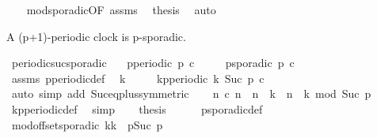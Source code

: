 \begin{isabellebody}
\ \ \isamarkupfalse%
\ mod{\isacharunderscore}sporadic{\isacharbrackleft}OF\ assms{\isacharparenleft}{}{\isacharparenright}{\isacharbrackright}\ \isamarkupfalse%
\ {\isacharquery}thesis\ \isamarkupfalse%
\ auto\isanewline
{}\isamarkupfalse%
%
\endisatagproof
{\isafoldproof}%
%
\isadelimproof
%
\endisadelimproof
%
\begin{isamarkuptext}%
A (p+1)-periodic clock is p-sporadic.%
\end{isamarkuptext}\isamarkuptrue%
\isamarkupfalse%
\ periodic{\isacharunderscore}suc{\isacharunderscore}sporadic{\isacharcolon}\isanewline
\ \ \ {\isacartoucheopen}p{\isacharunderscore}periodic\ {\isacharparenleft}p{\isacharplus}{}{\isacharparenright}\ c{\isacartoucheclose}\isanewline
\ \ \ \ \ {\isacartoucheopen}p{\isacharunderscore}sporadic\ p\ c{\isacartoucheclose}\isanewline
%
\isadelimproof
%
\endisadelimproof
%
\isatagproof
{}\isamarkupfalse%
\ {\isacharminus}\isanewline
\ \ \isamarkupfalse%
\ assms\ p{\isacharunderscore}periodic{\isacharunderscore}def\ \isamarkupfalse%
\ k\isanewline
\ \ \ \ \ {\isacartoucheopen}kp{\isacharunderscore}periodic\ k\ {\isacharparenleft}Suc\ p{\isacharparenright}\ c{\isacartoucheclose}\ \isamarkupfalse%
\ {\isacharparenleft}auto\ simp\ add{\isacharcolon}\ Suc{\isacharunderscore}eq{\isacharunderscore}plus{}{\isacharbrackleft}symmetric{\isacharbrackright}{\isacharparenright}\isanewline
\ \ \isamarkupfalse%
\ {\isacartoucheopen}{\isasymforall}n{\isachardot}\ c\ n\ {\isacharequal}\ {\isacharparenleft}{\isacharparenleft}n\ {\isasymge}\ k{\isacharparenright}\ {\isasymand}\ {\isacharparenleft}{\isacharparenleft}n\ {\isacharminus}\ k{\isacharparenright}\ mod\ {\isacharparenleft}Suc\ p{\isacharparenright}\ {\isacharequal}\ {}{\isacharparenright}{\isacharparenright}{\isacartoucheclose}\ \isamarkupfalse%
\ kp{\isacharunderscore}periodic{\isacharunderscore}def\ \isamarkupfalse%
\ simp\isanewline
\ \ \isamarkupfalse%
\ {\isacharquery}thesis\isanewline
\ \ \ \ \isamarkupfalse%
\ p{\isacharunderscore}sporadic{\isacharunderscore}def\isanewline
\ \ \ \ \isamarkupfalse%
\ mod{\isacharunderscore}offset{\isacharunderscore}sporadic{\isacharprime}{\isacharbrackleft}\ k{\isacharequal}k\ \ p{\isacharequal}{\isacartoucheopen}Suc\ p{\isacartoucheclose}{\isacharbrackright}\isanewline

\end{isabellebody}
